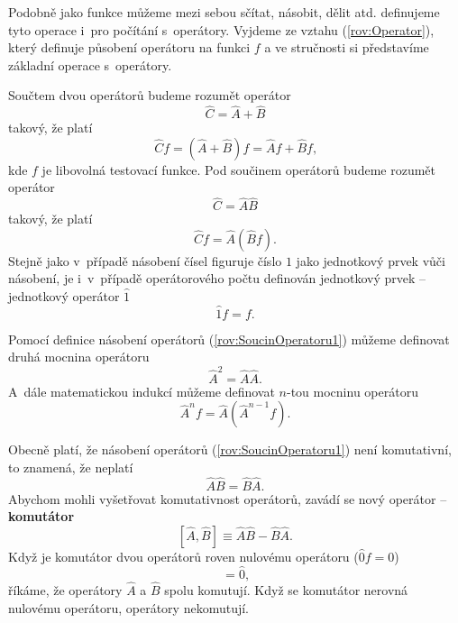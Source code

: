 Podobně jako funkce můžeme mezi sebou sčítat, násobit, dělit atd. definujeme tyto operace i~pro počítání s~operátory. Vyjdeme ze vztahu (\ref{rov:Operator}), který definuje působení operátoru na funkci $f$ a ve stručnosti si představíme základní operace s~operátory.

Součtem dvou operátorů budeme rozumět operátor
\begin{equation}
\hat{C} = \hat{A}+\hat{B}
\label{rov:SoucetOperatoru1}
\end{equation}
takový, že platí
\begin{equation}
\hat{C}f = (\hat{A}+\hat{B})f=\hat{A}f + \hat{B}f \mbox{,}
\label{rov:SoucetOperatoru2}
\end{equation}
kde $f$ je libovolná testovací funkce. Pod součinem operátorů budeme rozumět operátor
\begin{equation}
\hat{C} = \hat{A}\hat{B}
\label{rov:SoucinOperatoru1}
\end{equation}
takový, že platí
\begin{equation}
\hat{C}f = \hat{A}(\hat{B}f) \mbox{.}
\label{rov:SoucinOperatoru2}
\end{equation}
Stejně jako v~případě násobení čísel figuruje číslo $1$ jako jednotkový prvek vůči násobení, je i~v~případě operátorového počtu definován jednotkový prvek -- jednotkový operátor $\hat{1}$
\begin{equation}
\hat{1} f = f \mbox{.}
\label{rov:JednotkovyOperator}
\end{equation}

\noindent Pomocí definice násobení operátorů (\ref{rov:SoucinOperatoru1}) můžeme definovat druhá mocnina operátoru
\begin{equation}
\hat{A}^2 = \hat{A}\hat{A} \mbox{.}
\label{rov:KvadratOperatoru} 
\end{equation}
A~dále matematickou indukcí můžeme definovat $n$-tou mocninu operátoru
\begin{equation}
\hat{A}^n f = \hat{A} (\hat{A}^{n-1} f) \mbox{.}
\label{rov:MocninaOperatoru}
\end{equation}

Obecně platí, že násobení operátorů (\ref{rov:SoucinOperatoru1}) není komutativní, to znamená, že neplatí
\begin{equation}
\hat{A}\hat{B} = \hat{B}\hat{A} \mbox{.}
\label{rov:KomutativnostOperatoru}
\end{equation}
Abychom mohli vyšetřovat komutativnost operátorů, zavádí se nový operátor -- \textbf{komutátor}
\begin{equation}
\boxed{[\hat{A},\hat{B}] \equiv \hat{A}\hat{B}-\hat{B}\hat{A} \mbox{.}}
\label{rov:KomutatorOperatoru}
\end{equation}
Když je komutátor dvou operátorů roven nulovému operátoru ($\hat{0}f=0$)
\begin{equation}
[\hat{A},\hat{B}] = \hat{0} \mbox{,}
\label{rov:Komutator1}
\end{equation}
říkáme, že operátory $\hat{A}$ a $\hat{B}$ spolu komutují. Když se komutátor nerovná nulovému operátoru, operátory nekomutují.

